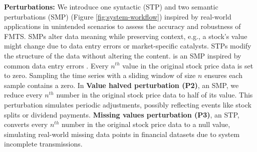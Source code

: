 \noindent \textbf{Perturbations:}
\label{sec:perturbations}
We introduce one syntactic (STP) and two semantic perturbations (SMP) (Figure \ref{fig:system-workflow}) inspired by real-world applications in unintended scenarios to assess the accuracy and robustness of FMTS. SMPs alter data meaning while preserving context, e.g., a stock's value might change due to data entry errors or market-specific catalysts. STPs modify the structure of the data without altering the content. %
 is an SMP inspired by common data entry errors \cite{ley2019analysis}. Every $n^{th}$ value in the original stock price data is set to zero. Sampling the time series with a sliding window of size $n$ ensures each sample contains a zero.
\noindent In {\bf Value halved perturbation (P2)}, an SMP, we reduce every $n^{th}$ number in the original stock price data to half of its value. This perturbation simulates periodic adjustments, possibly reflecting events like stock splits or dividend payments. {\bf Missing values perturbation (P3)}, an STP, converts every $n^{th}$ number in the original stock price data to a null value, simulating real-world missing data points in financial datasets due to system incomplete transmissions.

